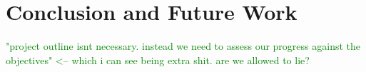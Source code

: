 \documentclass[main.tex]{subfiles}
\begin{document}
\chapter{Conclusion and Future Work}

\textcolor{green}{"project outline isnt necessary. instead we need to assess our progress against the objectives" <-- which i can see being extra shit. are we allowed to lie?}
\end{document}
